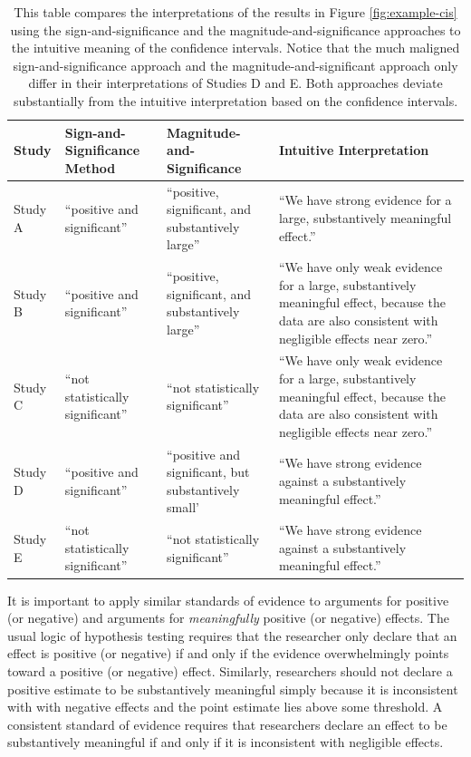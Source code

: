 \documentclass[12pt]{article}
\begin{document}
\renewcommand{\arraystretch}{1.5}
\begin{table}[H]
\begin{center}
\begin{scriptsize}
\begin{tabular}{|>{\centering\arraybackslash}m{.5in}>{\centering\arraybackslash}m{1.75in}>{\centering\arraybackslash}m{1.75in}>{\centering\arraybackslash}
m{1.75in}|}
\hline
Study & Sign-and-Significance Method & Magnitude-and-Significance & Intuitive Interpretation\\ 
\hline
Study A & ``positive and significant'' & ``positive, significant, and substantively large'' & ``We have strong evidence for a large, substantively meaningful effect.''\\
Study B & ``positive and significant'' & ``positive, significant, and substantively large'' & ``We have only weak evidence for a large, substantively meaningful effect, because the data are also consistent with negligible effects near zero.''\\
Study C & ``not statistically significant'' & ``not statistically significant'' & ``We have only weak evidence for a large, substantively meaningful effect, because the data are also consistent with negligible effects near zero.''\\
Study D & ``positive and significant'' & ``positive and significant, but substantively small' & ``We have strong evidence against a substantively meaningful effect.''\\
Study E & ``not statistically significant'' & ``not statistically significant'' & ``We have strong evidence against a substantively meaningful effect.''\\
\hline
\end{tabular}\caption{This table compares the interpretations of the results in Figure \ref{fig:example-cis} using the sign-and-significance and the magnitude-and-significance approaches to the intuitive meaning of the confidence intervals. Notice that the much maligned sign-and-significance approach and the magnitude-and-significant approach only differ in their interpretations of Studies D and E. Both approaches deviate substantially from the intuitive interpretation based on the confidence intervals.}\label{tab:example-cis}
\end{scriptsize}
\end{center}
\end{table}

It is important to apply similar standards of evidence to arguments for positive (or negative) and arguments for \emph{meaningfully} positive (or negative) effects. The usual logic of hypothesis testing requires that the researcher only declare that an effect is positive (or negative) if and only if the evidence overwhelmingly points toward a positive (or negative) effect. Similarly, researchers should not declare a positive estimate to be substantively meaningful simply because it is inconsistent with with negative effects and the point estimate lies above some threshold. A consistent standard of evidence requires that researchers declare an effect to be substantively meaningful if and only if it is inconsistent with negligible effects.
\end{document}
